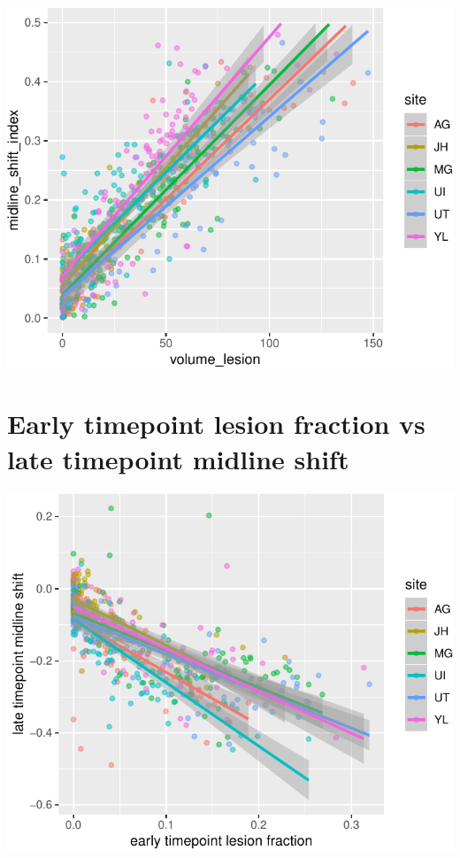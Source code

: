 \documentclass[
]{article}
\begin{document}
\begin{center}\includegraphics{paper_files/figure-latex/plot_lesion_shift-1} \end{center}

\hypertarget{early-timepoint-lesion-fraction-vs-late-timepoint-midline-shift}{%
\section{Early timepoint lesion fraction vs late timepoint midline
shift}\label{early-timepoint-lesion-fraction-vs-late-timepoint-midline-shift}}

\begin{center}\includegraphics{paper_files/figure-latex/plot_lesion_shift_time-1} \end{center}
\end{document}
